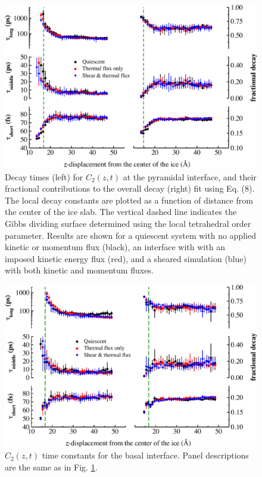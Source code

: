 \begin{figure}
\includegraphics[width=\linewidth]{Figures/Pyr_lcorrz}
\caption{\label{fig:Pyrorient} Decay times (left) for $C_2(z,t)$ at
  the pyramidal interface, and their fractional contributions to the
  overall decay (right) fit using Eq. (8). The local decay constants
  are plotted as a function of distance from the center of the ice
  slab. The vertical dashed line indicates the Gibbs dividing surface
  determined using the local tetrahedral order parameter.  Results are
  shown for a quiescent system with no applied kinetic or momentum
  flux (black), an interface with with an imposed kinetic energy flux
  (red), and a sheared simulation (blue) with both kinetic and
  momentum fluxes.}
\end{figure}

\begin{figure}
\includegraphics[width=\linewidth]{Figures/Bas_lcorrz}
\caption{\label{fig:Borient} $C_2(z,t)$ time constants for the basal
  interface.  Panel descriptions are the same as in
  Fig. \ref{fig:Pyrorient}. }
\end{figure}

